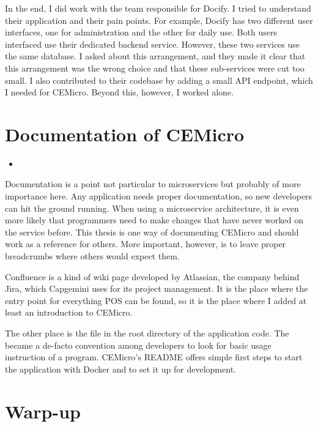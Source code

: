 In the end, I did work with the team responsible for Docify. I tried to understand their application and their pain points. For example, Docify has two different user interfaces, one for administration and the other for daily use. Both users interfaced use their dedicated backend service. However, these two services use the same database. I asked about this arrangement, and they made it clear that this arrangement was the wrong choice and that these sub-services were cut too small. I also contributed to their codebase by adding a small API endpoint, which I needed for CEMicro. Beyond this, however, I worked alone.


\section{Documentation of CEMicro}

\begin{itemize}
  \item {}
\end{itemize}

Documentation is a point not particular to microservices but probably of more importance here. Any application needs proper documentation, so new developers can hit the ground running. When using a microservice architecture, it is even more likely that programmers need to make changes that have never worked on the service before. This thesis is one way of documenting CEMicro and should work as a reference for others. More important, however, is to leave proper breadcrumbs where others would expect them.

Confluence is a kind of wiki page developed by Atlassian, the company behind Jira, which Capgemini uses for its project management. It is the place where the entry point for everything POS can be found, so it is the place where I added at least an introduction to CEMicro.

The other place is the  file in the root directory of the application code. The  became a de-facto convention among developers to look for basic usage instruction of a program. CEMicro's README offers simple first steps to start the application with Docker and to set it up for development.


\section{Warp-up}
